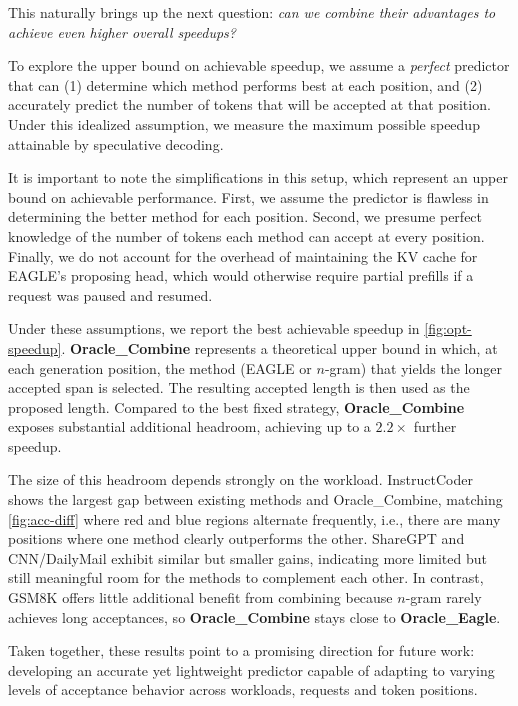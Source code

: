 This naturally brings up the next question: \emph{can we combine their advantages to achieve even higher overall speedups?}

To explore the upper bound on achievable speedup, we assume a \emph{perfect} predictor that can (1) determine which method performs best at each position, and (2) accurately predict the number of tokens that will be accepted at that position. Under this idealized assumption, we measure the maximum possible speedup attainable by speculative decoding.

It is important to note the simplifications in this setup, which represent an upper bound on achievable performance. First, we assume the predictor is flawless in determining the better method for each position. Second, we presume perfect knowledge of the number of tokens each method can accept at every position. 
Finally, we do not account for the overhead of maintaining the KV cache for EAGLE's proposing head, which would otherwise require partial prefills if a request was paused and resumed.


Under these assumptions, we report the best achievable speedup in \autoref{fig:opt-speedup}. \textbf{Oracle\_Combine} represents a theoretical upper bound in which, at each generation position, the method (EAGLE or $n$-gram) that yields the longer accepted span is selected. The resulting accepted length is then used as the proposed length. Compared to the best fixed strategy, \textbf{Oracle\_Combine} exposes substantial additional headroom, achieving up to a $2.2\times$ further speedup.

The size of this headroom depends strongly on the workload. InstructCoder shows the largest gap between existing methods and Oracle\_Combine, matching \autoref{fig:acc-diff} where red and blue regions alternate frequently, i.e., there are many positions where one method clearly outperforms the other. ShareGPT and CNN/DailyMail exhibit similar but smaller gains, indicating more limited but still meaningful room for the methods to complement each other. In contrast, GSM8K offers little additional benefit from combining because $n$-gram rarely achieves long acceptances, so \textbf{Oracle\_Combine} stays close to \textbf{Oracle\_Eagle}. 

Taken together, these results point to a promising direction for future work: developing an accurate yet lightweight predictor capable of adapting to varying levels of acceptance behavior across workloads, requests and token positions.

